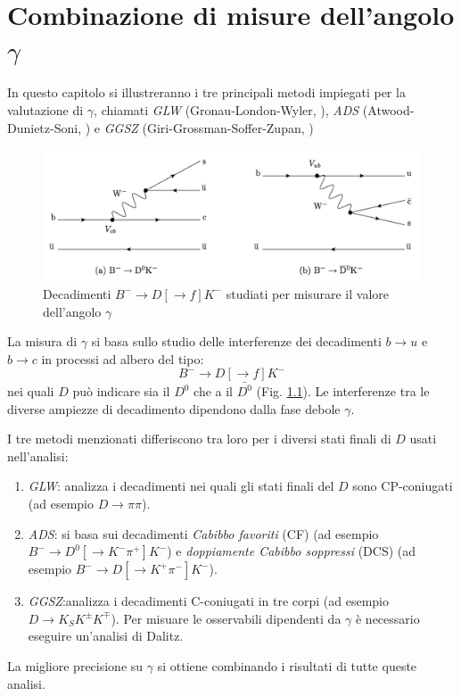 
\chapter{Combinazione di misure dell'angolo $\gamma$}
\noindent
In questo capitolo si illustreranno i tre principali metodi impiegati per la valutazione di $\gamma$, chiamati \emph{GLW} (Gronau-London-Wyler, \cite{Gronau:1990ra}\cite{Gronau:1991dp}), 
\emph{ADS} (Atwood-Dunietz-Soni, \cite{Atwood:1996ci}) e \emph{GGSZ} (Giri-Grossman-Soffer-Zupan, \cite{Giri:2003ty}) 
\begin{figure}
\begin{center}
\includegraphics[scale=0.3]{Immagini/diagrammi}
\caption{Decadimenti $B^{-} \longrightarrow D[\rightarrow f]K^{-}$ studiati per misurare il valore dell'angolo $\gamma$}
\label{DIAGRAMMIDIFEYNMAN}
\end{center}
\end{figure}

La misura di $\gamma$ si basa sullo studio delle interferenze dei decadimenti $b\rightarrow u$ e $b\rightarrow c$ in processi ad albero del tipo:
\begin{equation}\label{B-dec}
 B^{-} \longrightarrow D[\rightarrow f]K^{-}
\end{equation}
nei quali $D$ può indicare sia il $D^0$ che a il $\bar{D^0}$ (Fig. \ref{DIAGRAMMIDIFEYNMAN}). 
Le interferenze tra le diverse ampiezze di decadimento dipendono dalla fase debole $\gamma$.

I tre metodi menzionati differiscono tra loro per i diversi stati finali di $D$  usati nell'analisi:
\begin{enumerate}
 \item \emph{GLW}: analizza i decadimenti nei quali gli stati finali del $D$ sono CP-coniugati (ad esempio $D\rightarrow \pi\pi$).
 \item \emph{ADS}: si basa sui decadimenti \emph{Cabibbo favoriti} (CF) (ad esempio $B^-\rightarrow D^0[\rightarrow K^{-}\pi^{+}] K^-$) e \emph{doppiamente Cabibbo soppressi} (DCS) (ad esempio $B^-\rightarrow D[\rightarrow K^{+}\pi^{-}] K^-$).
 \item \emph{GGSZ}:analizza i decadimenti C-coniugati in tre corpi (ad esempio $D\rightarrow K_S K^\pm K^\mp$). 
                   Per misuare le osservabili dipendenti da $\gamma$ è necessario eseguire un'analisi di Dalitz.
\end{enumerate}
La migliore precisione su $\gamma$ si ottiene combinando i risultati di tutte queste analisi. 

